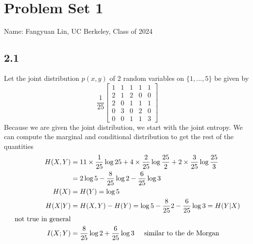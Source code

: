 \documentclass[../main.tex]{subfiles}
\begin{document}
\section*{Problem Set 1}
    Name: Fangyuan Lin, UC Berkeley, Class of 2024
\subsection*{2.1}
Let the joint distribution $p(x,y)$ of 2 random variables on $\{1,...,5\}$ be given by \begin{equation*}
    \frac{1}{25}\begin{bmatrix}
        1 & 1 & 1 & 1 & 1\\
        2 & 1 & 2 & 0 & 0\\
        2 & 0 & 1 & 1 & 1\\
        0 & 3 & 0 & 2 & 0\\
        0 & 0 & 1 & 1 & 3
    \end{bmatrix}
\end{equation*}
Because we are given the joint distribution, we start with the joint entropy. We can compute the marginal and conditional distribution to get the rest of the quantities
\begin{align*}
    H(X,Y) &= 11\times \frac{1}{25}\log 25 + 4 \times \frac{2}{25} \log \frac{25}{2} + 2\times \frac{3}{25}\log \frac{25}{3}\\
    &= 2\log 5 - \frac{8}{25}\log 2 - \frac{6}{25}\log 3\\
    H(X)&=H(Y)=\log 5\\
    H(X|Y) &= H(X,Y)-H(Y) = \log 5 - \frac{8}{25} 2 -\frac{6}{25}\log 3 = H(Y|X)\\ \text{not true in general}\\
    I(X;Y)&=\frac{8}{25}\log 2 + \frac{6}{25}\log 3 \hspace{5mm}\text{similar to the de Morgan}
\end{align*}
\end{document}
